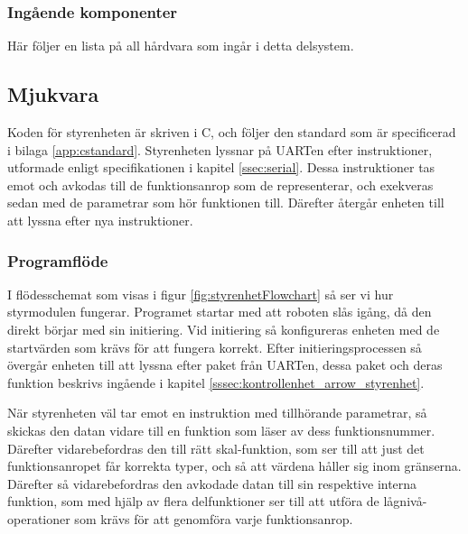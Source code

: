 \documentclass[a4paper,11pt]{article}
\begin{document}
\subsubsection{Ingående komponenter}
Här följer en lista på all hårdvara som ingår i detta delsystem.

\begin{HardwareList}
\end{HardwareList}

\subsection{Mjukvara}
Koden för styrenheten är skriven i C, och följer den standard som är specificerad i bilaga \ref{app:cstandard}. 
Styrenheten lyssnar på UARTen efter instruktioner, utformade enligt specifikationen i kapitel \ref{ssec:serial}. Dessa instruktioner tas emot och avkodas till de funktionsanrop som de representerar, och exekveras sedan med de parametrar som hör funktionen till. Därefter återgår enheten till att lyssna efter nya instruktioner.

\subsubsection{Programflöde}
I flödesschemat som visas i figur \ref{fig:styrenhetFlowchart} så ser vi hur styrmodulen fungerar. Programet startar med att roboten slås igång, då den direkt börjar med sin initiering. Vid initiering så konfigureras enheten med de startvärden som krävs för att fungera korrekt. Efter initieringsprocessen så övergår enheten till att lyssna efter paket från UARTen, dessa paket och deras funktion beskrivs ingående i kapitel \ref{sssec:kontrollenhet_arrow_styrenhet}. 

När styrenheten väl tar emot en instruktion med tillhörande parametrar, så skickas den datan vidare till en funktion som läser av dess funktionsnummer. Därefter vidarebefordras den till rätt skal-funktion, som ser till att just det funktionsanropet får korrekta typer, och så att värdena håller sig inom gränserna. Därefter så vidarebefordras den avkodade datan till sin respektive interna funktion, som med hjälp av flera delfunktioner ser till att utföra de lågnivå-operationer som krävs för att genomföra varje funktionsanrop. 
\end{document}
